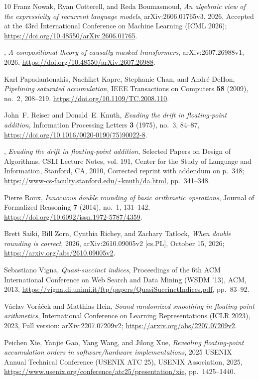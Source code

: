 \documentclass[11pt,reqno]{amsart}
\theoremstyle{definition}
\theoremstyle{remark}
\numberwithin{equation}{section}
\begin{document}
\begin{thebibliography}{10}
Franz Nowak, Ryan Cotterell, and Reda Boumasmoud, \emph{An algebraic view of
  the expressivity of recurrent language models}, arXiv:2606.01765v3, 2026,
  Accepted at the 43rd International Conference on Machine Learning ({ICML}
  2026); \url{https://doi.org/10.48550/arXiv.2606.01765}.

\bysame, \emph{A compositional theory of causally masked transformers},
  arXiv:2607.26988v1, 2026, \url{https://doi.org/10.48550/arXiv.2607.26988}.

Karl Papadantonakis, Nachiket Kapre, Stephanie Chan, and Andr{\'e} DeHon,
  \emph{Pipelining saturated accumulation}, IEEE Transactions on Computers
  \textbf{58} (2009), no.~2, 208--219,
  \url{https://doi.org/10.1109/TC.2008.110}.

John~F. Reiser and Donald~E. Knuth, \emph{Evading the drift in floating-point
  addition}, Information Processing Letters \textbf{3} (1975), no.~3, 84--87,
  \url{https://doi.org/10.1016/0020-0190(75)90022-8}.

\bysame, \emph{Evading the drift in floating-point addition}, Selected Papers
  on Design of Algorithms, CSLI Lecture Notes, vol. 191, Center for the Study
  of Language and Information, Stanford, CA, 2010, Corrected reprint with
  addendum on p.~348; \url{https://www-cs-faculty.stanford.edu/~knuth/da.html},
  pp.~341--348.

Pierre Roux, \emph{Innocuous double rounding of basic arithmetic operations},
  Journal of Formalized Reasoning \textbf{7} (2014), no.~1, 131--142,
  \url{https://doi.org/10.6092/issn.1972-5787/4359}.

Brett Saiki, Bill Zorn, Cynthia Richey, and Zachary Tatlock, \emph{When double
  rounding is correct}, 2026, arXiv:2610.09005v2 [cs.PL], October 15, 2026;
  \url{https://arxiv.org/abs/2610.09005v2}.

Sebastiano Vigna, \emph{Quasi-succinct indices}, Proceedings of the 6th {ACM}
  International Conference on Web Search and Data Mining ({WSDM} '13), ACM,
  2013, \url{https://vigna.di.unimi.it/ftp/papers/QuasiSuccinctIndices.pdf},
  pp.~83--92.

V{\'a}clav Vor{\'a}{\v{c}}ek and Matthias Hein, \emph{Sound randomized
  smoothing in floating-point arithmetics}, International Conference on
  Learning Representations ({ICLR} 2023), 2023, Full version:
  arXiv:2207.07209v2; \url{https://arxiv.org/abs/2207.07209v2}.

Peichen Xie, Yanjie Gao, Yang Wang, and Jilong Xue, \emph{Revealing
  floating-point accumulation orders in software/hardware implementations},
  2025 {USENIX} Annual Technical Conference ({USENIX ATC} 25), USENIX
  Association, 2025,
  \url{https://www.usenix.org/conference/atc25/presentation/xie},
  pp.~1425--1440.

\end{thebibliography}
\end{document}
